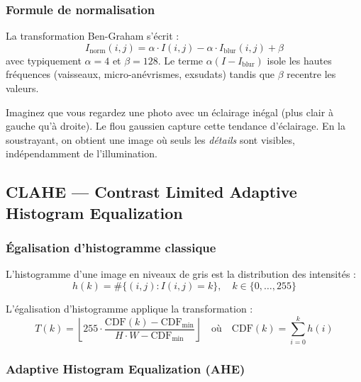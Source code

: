 \documentclass[11pt,a4paper]{article}
\begin{document}
\subsubsection{Formule de normalisation}

La transformation Ben-Graham s'écrit :
\begin{equation}
  \boxed{I_{\text{norm}}(i,j) = \alpha \cdot I(i,j) - \alpha \cdot I_{\text{blur}}(i,j) + \beta}
\end{equation}
avec typiquement $\alpha = 4$ et $\beta = 128$. Le terme $\alpha(I - I_{\text{blur}})$ isole les hautes fréquences (vaisseaux, micro-anévrismes, exsudats) tandis que $\beta$ recentre les valeurs.

\begin{notebox}[Intuition]
Imaginez que vous regardez une photo avec un éclairage inégal (plus clair à gauche qu'à droite). Le flou gaussien capture cette tendance d'éclairage. En la soustrayant, on obtient une image où seuls les \emph{détails} sont visibles, indépendamment de l'illumination.
\end{notebox}

\subsection{CLAHE --- Contrast Limited Adaptive Histogram Equalization}

\subsubsection{Égalisation d'histogramme classique}

L'histogramme d'une image en niveaux de gris est la distribution des intensités :
\begin{equation}
  h(k) = \#\{(i,j) : I(i,j) = k\}, \quad k \in \{0,\ldots,255\}
\end{equation}

L'égalisation d'histogramme applique la transformation :
\begin{equation}
  T(k) = \left\lfloor 255 \cdot \frac{\text{CDF}(k) - \text{CDF}_{\min}}{H \cdot W - \text{CDF}_{\min}} \right\rfloor
  \quad \text{où} \quad
  \text{CDF}(k) = \sum_{i=0}^{k} h(i)
\end{equation}

\subsubsection{Adaptive Histogram Equalization (AHE)}
\end{document}
